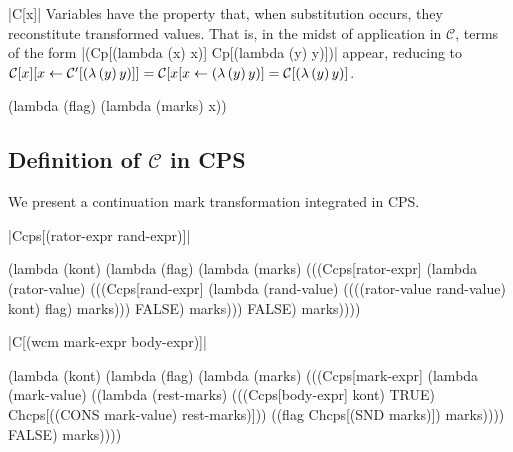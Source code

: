 \begin{schemedefinition}{\scheme|C[x]|}
Variables have the property that, when substitution occurs, they reconstitute transformed values. That is, in the midst of application in $\mathcal{C}$, terms of the form \scheme|(Cp[(lambda (x) x)] Cp[(lambda (y) y)])| appear, reducing to $\mathcal{C}[x][x\leftarrow \mathcal{C}'[(\lambda\,(y)\,y)]]=\mathcal{C}[x[x\leftarrow(\lambda\,(y)\,y)]=\mathcal{C}[(\lambda\,(y)\,y)]$.
\begin{schemeblock}
\begin{schemedisplay}
(lambda (flag)
  (lambda (marks)
    x))
\end{schemedisplay}
\end{schemeblock}
\end{schemedefinition}

\subsection{Definition of $\mathcal{C}$ in CPS}

We present a continuation mark transformation integrated in CPS.

\begin{schemedefinition}{\scheme|Ccps[(rator-expr rand-expr)]|}
\begin{schemeblock}
\begin{schemedisplay}
(lambda (kont)
   (lambda (flag)
     (lambda (marks)
       (((Ccps[rator-expr]
          (lambda (rator-value)
            (((Ccps[rand-expr]
               (lambda (rand-value)
                 ((((rator-value rand-value) kont) flag) marks)))
              FALSE) marks)))
         FALSE) marks))))
\end{schemedisplay}
\end{schemeblock}
\end{schemedefinition}

\begin{schemedefinition}{\scheme|C[(wcm mark-expr body-expr)]|}
\begin{schemeblock}
\begin{schemedisplay}
(lambda (kont)
  (lambda (flag)
    (lambda (marks)
      (((Ccps[mark-expr]
          (lambda (mark-value) 
            ((lambda (rest-marks) 
               (((Ccps[body-expr] kont) TRUE) Chcps[((CONS mark-value) rest-marks)]))
             ((flag Chcps[(SND marks)]) marks))))
        FALSE) marks))))
\end{schemedisplay}
\end{schemeblock}
\end{schemedefinition}

